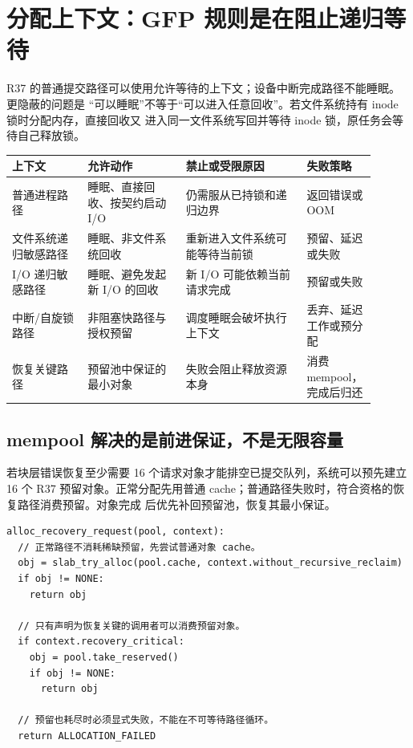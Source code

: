 \section{分配上下文：GFP 规则是在阻止递归等待}

R37 的普通提交路径可以使用允许等待的上下文；设备中断完成路径不能睡眠。更隐蔽的问题是
“可以睡眠”不等于“可以进入任意回收”。若文件系统持有 inode 锁时分配内存，直接回收又
进入同一文件系统写回并等待 inode 锁，原任务会等待自己释放锁。

\begin{longtable}{|L{0.2\linewidth}|L{0.26\linewidth}|L{0.32\linewidth}|L{0.12\linewidth}|}
\hline
上下文 & 允许动作 & 禁止或受限原因 & 失败策略 \\ \hline
普通进程路径 & 睡眠、直接回收、按契约启动 I/O & 仍需服从已持锁和递归边界 & 返回错误或 OOM \\\tablerowrule
文件系统递归敏感路径 & 睡眠、非文件系统回收 & 重新进入文件系统可能等待当前锁 & 预留、延迟或失败 \\\tablerowrule
I/O 递归敏感路径 & 睡眠、避免发起新 I/O 的回收 & 新 I/O 可能依赖当前请求完成 & 预留或失败 \\\tablerowrule
中断/自旋锁路径 & 非阻塞快路径与授权预留 & 调度睡眠会破坏执行上下文 & 丢弃、延迟工作或预分配 \\\tablerowrule
恢复关键路径 & 预留池中保证的最小对象 & 失败会阻止释放资源本身 & 消费 mempool，完成后归还 \\
\hline
\end{longtable}

\subsection{mempool 解决的是前进保证，不是无限容量}

若块层错误恢复至少需要 16 个请求对象才能排空已提交队列，系统可以预先建立 16 个 R37
预留对象。正常分配先用普通 cache；普通路径失败时，符合资格的恢复路径消费预留。对象完成
后优先补回预留池，恢复其最小保证。

\begin{lstlisting}
alloc_recovery_request(pool, context):
  // 正常路径不消耗稀缺预留，先尝试普通对象 cache。
  obj = slab_try_alloc(pool.cache, context.without_recursive_reclaim)
  if obj != NONE:
    return obj

  // 只有声明为恢复关键的调用者可以消费预留对象。
  if context.recovery_critical:
    obj = pool.take_reserved()
    if obj != NONE:
      return obj

  // 预留也耗尽时必须显式失败，不能在不可等待路径循环。
  return ALLOCATION_FAILED
\end{lstlisting}

